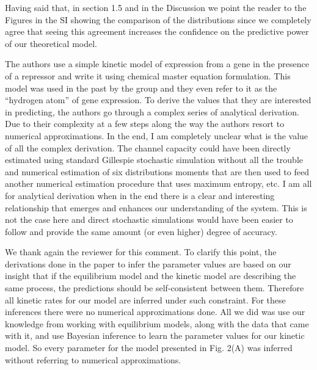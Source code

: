 Having said that, in section 1.5 and in the Discussion we point the reader to
the Figures in the SI showing the comparison of the distributions since we
completely agree that seeing this agreement increases the confidence on the
predictive power of our theoretical model.

\begin{tcolorbox}
The authors use a simple kinetic model of expression from a gene in the presence
of a repressor and write it using chemical master equation formulation. This
model was used in the past by the group and they even refer to it as the
“hydrogen atom” of gene expression. To derive the values that they are
interested in predicting, the authors go through a complex series of analytical
derivation. Due to their complexity at a few steps along the way the authors
resort to numerical approximations. In the end, I am completely unclear what is
the value of all the complex derivation. The channel capacity could have been
directly estimated using standard Gillespie stochastic simulation without all
the trouble and numerical estimation of six distributions moments that are then
used to feed another numerical estimation procedure that uses maximum entropy,
etc. I am all for analytical derivation when in the end there is a clear and
interesting relationship that emerges and enhances our understanding of the
system. This is not the case here and direct stochastic simulations would have
been easier to follow and provide the same amount (or even higher) degree of
accuracy.
\end{tcolorbox}

We thank again the reviewer for this comment. To clarify this point, the
derivations done in the paper to infer the parameter values are based on our
insight that if the equilibrium model and the kinetic model are describing the
same process, the predictions should be self-consistent between them. Therefore
all kinetic rates for our model are inferred under such constraint. For these
inferences there were no numerical approximations done. All we did was use our
knowledge from working with equilibrium models, along with the data that came
with it, and use Bayesian inference to learn the parameter values for our
kinetic model. So every parameter for the model presented in Fig. 2(A) was
inferred without referring to numerical approximations.

